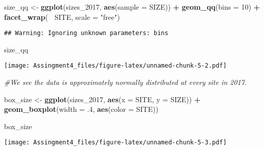 \documentclass[]{article}
\newenvironment{Shaded}{\begin{snugshade}}{\end{snugshade}}
\newcommand{\KeywordTok}[1]{\textcolor[rgb]{0.13,0.29,0.53}{\textbf{#1}}}
\newcommand{\DataTypeTok}[1]{\textcolor[rgb]{0.13,0.29,0.53}{#1}}
\newcommand{\DecValTok}[1]{\textcolor[rgb]{0.00,0.00,0.81}{#1}}
\newcommand{\StringTok}[1]{\textcolor[rgb]{0.31,0.60,0.02}{#1}}
\newcommand{\CommentTok}[1]{\textcolor[rgb]{0.56,0.35,0.01}{\textit{#1}}}
\newcommand{\OperatorTok}[1]{\textcolor[rgb]{0.81,0.36,0.00}{\textbf{#1}}}
\newcommand{\NormalTok}[1]{#1}
\begin{document}
\begin{Shaded}
\begin{Highlighting}[]
\NormalTok{size_qq <-}\StringTok{ }\KeywordTok{ggplot}\NormalTok{(sizes_}\DecValTok{2017}\NormalTok{, }\KeywordTok{aes}\NormalTok{(}\DataTypeTok{sample =}\NormalTok{ SIZE)) }\OperatorTok{+}
\StringTok{  }\KeywordTok{geom_qq}\NormalTok{(}\DataTypeTok{bins =} \DecValTok{10}\NormalTok{) }\OperatorTok{+}
\StringTok{  }\KeywordTok{facet_wrap}\NormalTok{(}\OperatorTok{~}\StringTok{ }\NormalTok{SITE, }\DataTypeTok{scale =} \StringTok{"free"}\NormalTok{)}
\end{Highlighting}
\end{Shaded}

\begin{verbatim}
## Warning: Ignoring unknown parameters: bins
\end{verbatim}

\begin{Shaded}
\begin{Highlighting}[]
\NormalTok{size_qq}
\end{Highlighting}
\end{Shaded}

\texttt{[image: Assingment4\_files/figure-latex/unnamed-chunk-5-2.pdf]}

\begin{Shaded}
\begin{Highlighting}[]
\CommentTok{#We see the data is approximately normally distributed at every site in 2017.}

\NormalTok{box_size <-}\StringTok{ }\KeywordTok{ggplot}\NormalTok{(sizes_}\DecValTok{2017}\NormalTok{, }\KeywordTok{aes}\NormalTok{(}\DataTypeTok{x =}\NormalTok{ SITE, }\DataTypeTok{y =}\NormalTok{ SIZE)) }\OperatorTok{+}
\StringTok{  }\KeywordTok{geom_boxplot}\NormalTok{(}\DataTypeTok{width =}\NormalTok{ .}\DecValTok{4}\NormalTok{, }\KeywordTok{aes}\NormalTok{(}\DataTypeTok{color =}\NormalTok{ SITE))}
  

\NormalTok{box_size}
\end{Highlighting}
\end{Shaded}

\texttt{[image: Assingment4\_files/figure-latex/unnamed-chunk-5-3.pdf]}

\begin{Shaded}
\end{Shaded}
\end{document}
